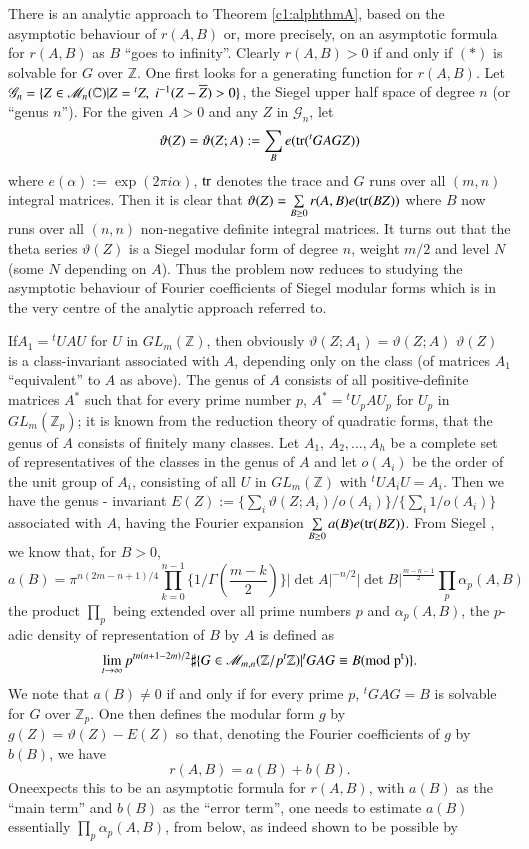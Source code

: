 There is an analytic approach to Theorem \ref{c1:alphthmA}, based on the asymptotic
behaviour of $r(A,B)$ or, more precisely, on an asymptotic formula for
$r(A,B)$ as $B$ ``goes to infinity''. Clearly $r(A,B)>0$ if and only
if $(\ast)$ is solvable for $G$ over $\mathbb{Z}$. One first looks for
a generating function for $r(A,B)$. Let
$\mathscr{G}_{n}=\{Z\in\mathscr{M}_{n}(\mathbb{C})|Z={}^{t}Z, \;
i^{-1}(Z-\overline{Z}) > 0\}$, 
the Siegel upper half space of degree $n$ (or ``genus $n$''). For the
given $A>0$ and any $Z$ in $\mathscr{G}_{n}$, let 
$$
\vartheta(Z)=\vartheta(Z;A):=\sum_{B}e(\operatorname{tr}({}^{t}GAGZ))
$$
where $e(\alpha):=\exp(2\pi i\alpha)$, $\operatorname{tr}$ denotes the trace and $G$
runs over all $(m,n)$ integral matrices. Then it is clear that
$\vartheta(Z)=\sum\limits_{B\geq 0}r(A,B)e(\operatorname{tr} (BZ))$ where $B$ now
runs over all $(n,n)$ non-negative definite integral matrices. It
turns out that the theta series $\vartheta(Z)$ is a Siegel modular
form of degree $n$, weight $m/2$ and level $N$ (some $N$ depending on
$A$). Thus the problem now reduces to studying the asymptotic
behaviour of Fourier coefficients of Siegel modular forms which is in
the very centre of the analytic approach referred to. 


If\pageoriginale $A_{1}={}^{t}UAU$ for $U$ in $GL_{m}(\mathbb{Z})$,
then obviously $\vartheta(Z;A_{1})=\vartheta(Z;A)$ \ie $\vartheta(Z)$
is a class-invariant associated with $A$, depending only on the class
(of matrices $A_{1}$ ``equivalent'' to $A$ as above). The genus of $A$
consists of all positive-definite matrices $A^{\ast}$ such that for
every prime number $p$, $A^{\ast}={}^{t}U_{p}AU_{p}$ for $U_{p}$ in
$GL_{m}(\mathbb{Z}_{p})$; it is known from the reduction theory of
quadratic forms, that the genus of $A$ consists of finitely many
classes. Let $A_{1}$, $A_{2},\ldots,A_{h}$ be a complete set of
representatives of the classes in the genus of $A$ and let $o(A_{i})
$ be the order of the unit group of $A_{i}$, consisting of all $U$ in
$GL_{m}(\mathbb{Z})$ with ${}^{t}UA_{i}U=A_{i}$. Then we have the
genus - invariant
$E(Z):=\{\sum_{i}\vartheta(Z;A_{i})/o(A_{i})\}/\{\sum\limits_{i}1/o(A_{i})\}$
associated with $A$, having the Fourier expansion $\sum\limits_{B\geq
  0}a(B)e(\operatorname{tr}(BZ))$. From Siegel \cite{key23}, we know that, for $B>0$,
$$
a(B)=\pi^{n(2m-n+1)/4}\prod^{n-1}_{k=0}\{1/\Gamma\left(\frac{m-k}{2}\right)\}|\det
A|^{-n/2}|\det B|^{\frac{m-n-1}{2}}\prod_{p}\alpha_{p}(A,B)
$$
the product $\prod\limits_{p}$ being extended over all prime numbers
$p$ and $\alpha_{p}(A,B)$, the $p$-adic density of representation of
$B$ by $A$ is defined as
$$\lim\limits_{t\to\infty}p^{tn(n+1-2m)/2}\sharp
\{G\in\mathscr{M}_{m,n}(\mathbb{Z}/p^{t}\mathbb{Z})|{}^{t}GAG\equiv
B(\rm{mod} \; p^{t})\}.$$ 
We note that $a(B)\neq 0$ if and only if for every
prime $p$, ${}^{t}GAG=B$ is solvable for $G$ over
$\mathbb{Z}_{p}$. One then defines the modular form $g$ by
$g(Z)=\vartheta(Z)-E(Z)$ so that, denoting the Fourier coefficients of
$g$ by $b(B)$, we have
$$
r(A,B)=a(B)+b(B).
$$
One\pageoriginale expects this to be an asymptotic formula for
$r(A,B)$, with $a(B)$ as the ``main term'' and $b(B)$ as the ``error
term'', one needs to estimate $a(B)$ \ie essentially
$\prod\limits_{p}\alpha_{p}(A,B)$, from below, as indeed shown to be
possible by


